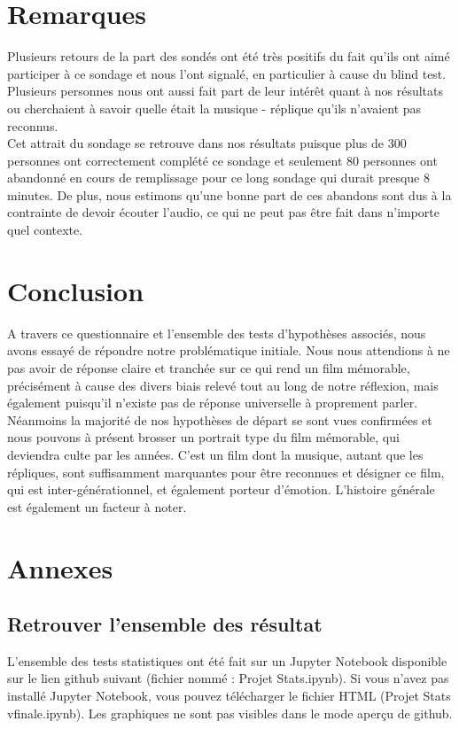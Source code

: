 \documentclass{article} %
\begin{document}
\section{Remarques}
Plusieurs retours de la part des sondés ont été très positifs du fait qu’ils ont aimé participer à ce sondage et nous l’ont signalé, en particulier à cause du blind test. Plusieurs personnes nous ont aussi fait part de leur intérêt quant à nos résultats ou cherchaient à savoir quelle était la musique - réplique qu’ils n’avaient pas reconnus.\\
Cet attrait du sondage se retrouve dans nos résultats puisque plus de 300 personnes ont correctement complété ce sondage et seulement 80 personnes ont abandonné en cours de remplissage pour ce long sondage qui durait presque 8 minutes. De plus, nous estimons qu’une bonne part de ces abandons sont dus à la contrainte de devoir écouter l’audio, ce qui ne peut pas être fait dans n’importe quel contexte.\\

\section{Conclusion}
A travers ce questionnaire et l’ensemble des tests d’hypothèses associés, nous avons essayé de répondre notre problématique initiale. Nous nous attendions à ne pas avoir de réponse claire et tranchée sur ce qui rend un film mémorable, précisément à cause des divers biais relevé tout au long de notre réflexion, mais également puisqu’il n’existe pas de réponse universelle à proprement parler.\\
Néanmoins la majorité de nos hypothèses de départ se sont vues confirmées et nous pouvons à présent brosser un portrait type du film mémorable, qui deviendra culte par les années. C’est un film dont la musique, autant que les répliques, sont suffisamment marquantes pour être reconnues et désigner ce film, qui est inter-générationnel, et également porteur d’émotion. L’histoire générale est également un facteur à noter.


\newpage
\section{Annexes}
\subsection{Retrouver l'ensemble des résultat}
L'ensemble des tests statistiques ont été fait sur un Jupyter Notebook disponible sur le lien github suivant (fichier nommé : Projet Stats.ipynb). Si vous n'avez pas installé Jupyter Notebook, vous pouvez télécharger le fichier HTML (Projet Stats vfinale.ipynb). Les graphiques ne sont pas visibles dans le mode aperçu de github.
\end{document}
